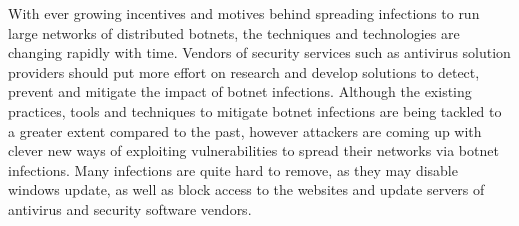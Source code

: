 With ever growing incentives and motives behind spreading infections to run large networks of distributed botnets, the techniques and technologies are changing rapidly with time. Vendors of security services such as antivirus solution providers should put more effort on research and develop solutions to detect, prevent and mitigate the impact of botnet infections. Although the existing practices, tools and techniques to mitigate botnet infections are being tackled to a greater extent compared to the past, however attackers are coming up with clever new ways of exploiting vulnerabilities to spread their networks via botnet infections. Many infections are quite hard to remove, as they may disable windows update, as well as block access to the websites and update servers of antivirus and security software vendors. 
